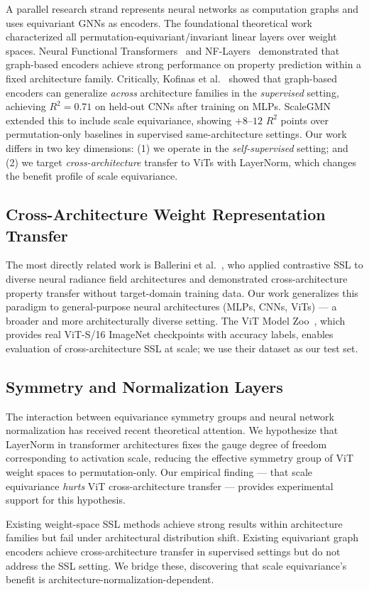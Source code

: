 A parallel research strand represents neural networks as computation graphs and uses
equivariant GNNs as encoders.
The foundational theoretical work~\cite{Navon2023Equivariant} characterized all
permutation-equivariant/invariant linear layers over weight spaces.
Neural Functional Transformers~\cite{Zhou2023Permutation} and
NF-Layers~\cite{Kofinas2024Graph} demonstrated that graph-based encoders achieve strong
performance on property prediction within a fixed architecture family.
Critically, Kofinas et al.~\cite{Kofinas2024Graph} showed that graph-based encoders can
generalize \emph{across} architecture families in the \emph{supervised} setting,
achieving $R^2 = 0.71$ on held-out CNNs after training on MLPs.
ScaleGMN~\cite{Kalogeropoulos2024Scale} extended this to include scale equivariance,
showing $+8$--$12$ $R^2$ points over permutation-only baselines in supervised same-architecture
settings.
Our work differs in two key dimensions:
(1) we operate in the \emph{self-supervised} setting; and
(2) we target \emph{cross-architecture} transfer to ViTs with LayerNorm,
which changes the benefit profile of scale equivariance.

\subsection*{Cross-Architecture Weight Representation Transfer}

The most directly related work is Ballerini et al.~\cite{Ballerini2025Weight},
who applied contrastive SSL to diverse neural radiance field architectures and demonstrated
cross-architecture property transfer without target-domain training data.
Our work generalizes this paradigm to general-purpose neural architectures
(MLPs, CNNs, ViTs) --- a broader and more architecturally diverse setting.
The ViT Model Zoo~\cite{Falk2025ModelZoo}, which provides real ViT-S/16 ImageNet
checkpoints with accuracy labels, enables evaluation of cross-architecture SSL at scale;
we use their dataset as our test set.

\subsection*{Symmetry and Normalization Layers}

The interaction between equivariance symmetry groups and neural network normalization has
received recent theoretical attention.
We hypothesize that LayerNorm in transformer architectures fixes the gauge degree of freedom
corresponding to activation scale, reducing the effective symmetry group of ViT weight spaces
to permutation-only.
Our empirical finding --- that scale equivariance \emph{hurts} ViT cross-architecture transfer ---
provides experimental support for this hypothesis.

Existing weight-space SSL methods achieve strong results within architecture families but
fail under architectural distribution shift.
Existing equivariant graph encoders achieve cross-architecture transfer in supervised settings
but do not address the SSL setting.
We bridge these, discovering that scale equivariance's benefit is
architecture-normalization-dependent.

